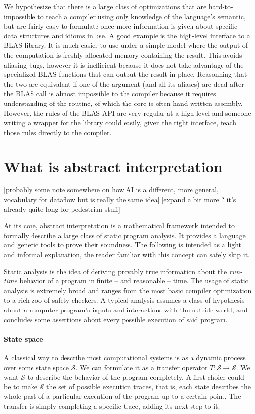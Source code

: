 \documentclass[14pt]{article}
\renewcommand{\S}{\mathcal{S}}
\begin{document}
We hypothesize that there is a large class of optimizations that are hard-to-impossible to teach a compiler using only knowledge of the language's semantic, but are fairly easy to formulate once more information is given about specific data structures and idioms in use. A good example is the high-level interface to a BLAS library.
It is much easier to use under a simple model where the output of the computation is freshly allocated memory containing the result. This avoids aliasing bugs, however it is inefficient because it does not take advantage of the specialized BLAS functions that can output the result in place. Reasonning that the two are equivalent if one of the argument (and all its aliases) are dead after the BLAS call is almost impossible to the compiler because it requires understanding of the routine, of which the core is often hand written assembly. However, the rules of the BLAS API are very regular at a high level and someone writing a wrapper for the library could easily, given the right interface, teach those rules directly to the compiler.

\break

\section*{What is abstract interpretation}

[probably some note somewhere on how AI is a different, more general, vocabulary for dataflow but is really the same idea]
[expand a bit more ? it's already quite long for pedestrian stuff]


At its core, abstract interpretation is a mathematical framework intended to formally describe a large class of static program analysis.
It provides a language and generic tools to prove their soundness.
The following is intended as a light and informal explanation, the reader familiar with this concept can safely skip it.

Static analysis is the idea of deriving provably true information about the \emph{run-time} behavior of a program in finite -- and reasonable -- time.
The usage of static analysis is extremely broad and ranges from the most basic compiler optimization to a rich zoo of safety checkers.
A typical analysis assumes a class of hypothesis about a computer program's inputs and interactions with the outside world, and concludes some assertions
about every possible execution of said program.

\paragraph{State space} A classical way to describe most computational systems is as a dynamic process over some state space $\S$. We can formulate it as a transfer operator $T:\S\to\S$. We want $\S$ to describe the behavior of the program completely. A first choice could be to make $\S$ the set of possible execution traces, that is, each state describes the whole past of a particular execution of the program up to a certain point. The transfer is simply completing a specific trace, adding its next step to it.
\end{document}
